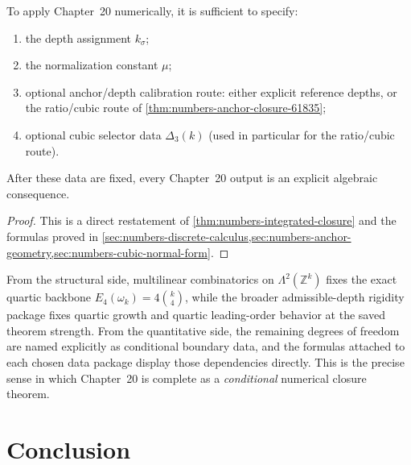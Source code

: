 \begin{corollary}
\label{cor:numbers-operational-checklist}
To apply Chapter~20 numerically, it is sufficient to
specify:
\begin{enumerate}[label=\textup{(\roman*)}]
\item
      the depth assignment \(k_\sigma\);
\item
      the normalization constant \(\mu\);
\item
      optional anchor/depth calibration route: either explicit reference
      depths, or the ratio/cubic route of
      \cref{thm:numbers-anchor-closure-61835};
\item
      optional cubic selector data \(\Delta_3(k)\)
      (used in particular for the ratio/cubic route).
\end{enumerate}
After these data are fixed, every Chapter~20 output is an explicit algebraic
consequence.
\end{corollary}

\begin{proof}
This is a direct restatement of
\cref{thm:numbers-integrated-closure} and the formulas proved in
\cref{sec:numbers-discrete-calculus,sec:numbers-anchor-geometry,sec:numbers-cubic-normal-form}.
\end{proof}

\begin{remark}
\label{rem:numbers-conditionally-complete}
From the structural side, multilinear combinatorics on
\(\Lambda^2(\mathbb Z^k)\) fixes the exact quartic backbone
\(E_4(\omega_k)=4\binom{k}{4}\), while the broader admissible-depth
rigidity package fixes quartic growth and quartic leading-order
behavior at the saved theorem strength.
From the quantitative side, the remaining degrees of freedom are
named explicitly as conditional boundary data, and the formulas
attached to each chosen data package display those dependencies
directly.
This is the precise sense in which Chapter~20 is complete as a
\emph{conditional} numerical closure theorem.
\end{remark}

\section{Conclusion}
\label{sec:numbers-conclusion}

